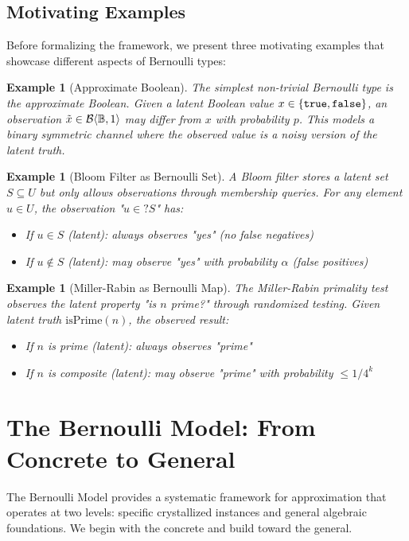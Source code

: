 \documentclass[11pt,final,hidelinks]{article}
\newtheorem{example}[theorem]{Example}
\newcommand{\bernoulli}[2]{\mathcal{B}\langle #1, #2 \rangle}
\begin{document}
\subsection{Motivating Examples}

Before formalizing the framework, we present three motivating examples that showcase different aspects of Bernoulli types:

\begin{example}[Approximate Boolean]
The simplest non-trivial Bernoulli type is the approximate Boolean. Given a latent Boolean value $x \in \{\mathtt{true}, \mathtt{false}\}$, an observation $\tilde{x} \in \bernoulli{\Bool}{1}$ may differ from $x$ with probability $p$. This models a binary symmetric channel where the observed value is a noisy version of the latent truth.
\end{example}

\begin{example}[Bloom Filter as Bernoulli Set]
A Bloom filter stores a latent set $S \subseteq U$ but only allows observations through membership queries. For any element $u \in U$, the observation "$u \in? S$" has:
\begin{itemize}
    \item If $u \in S$ (latent): always observes "yes" (no false negatives)
    \item If $u \notin S$ (latent): may observe "yes" with probability $\alpha$ (false positives)
\end{itemize}
\end{example}

\begin{example}[Miller-Rabin as Bernoulli Map]
The Miller-Rabin primality test observes the latent property "is $n$ prime?" through randomized testing. Given latent truth $\text{isPrime}(n)$, the observed result:
\begin{itemize}
    \item If $n$ is prime (latent): always observes "prime" 
    \item If $n$ is composite (latent): may observe "prime" with probability $\leq 1/4^k$
\end{itemize}
\end{example}

\section{The Bernoulli Model: From Concrete to General}

The Bernoulli Model provides a systematic framework for approximation that operates at two levels: specific crystallized instances and general algebraic foundations. We begin with the concrete and build toward the general.
\end{document}
